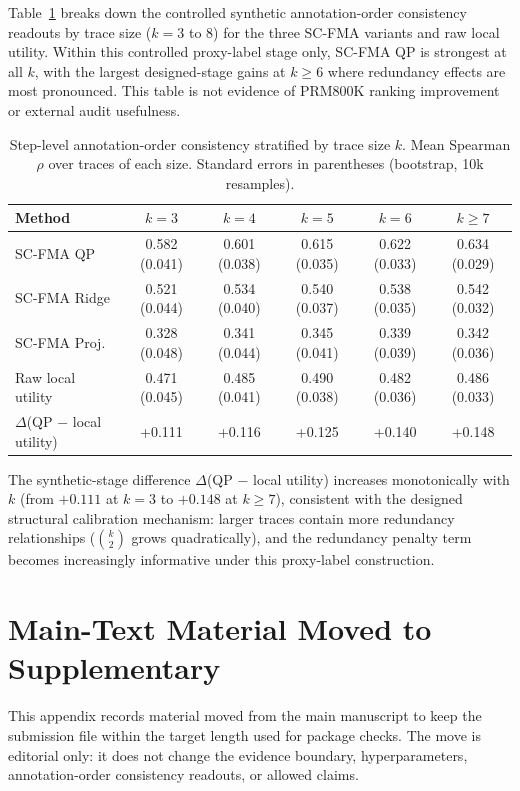 \documentclass[pdflatex,sn-mathphys-num]{sn-jnl}
\begin{document}
Table~\ref{tab:per-size} breaks down the controlled synthetic annotation-order consistency readouts by trace size ($k = 3$ to $8$) for the three SC-FMA variants and raw local utility. Within this controlled proxy-label stage only, SC-FMA QP is strongest at all $k$, with the largest designed-stage gains at $k \ge 6$ where redundancy effects are most pronounced. This table is not evidence of PRM800K ranking improvement or external audit usefulness.

\begin{table}[ht]
\caption{Step-level annotation-order consistency stratified by trace size $k$. Mean Spearman $\rho$ over traces of each size. Standard errors in parentheses (bootstrap, 10k resamples).}
\label{tab:per-size}
\centering
\small
\begin{tabular}{lccccc}
\toprule
\textbf{Method} & $k=3$ & $k=4$ & $k=5$ & $k=6$ & $k \ge 7$ \\
\midrule
SC-FMA QP      & 0.582 (0.041) & 0.601 (0.038) & 0.615 (0.035) & 0.622 (0.033) & 0.634 (0.029) \\
SC-FMA Ridge   & 0.521 (0.044) & 0.534 (0.040) & 0.540 (0.037) & 0.538 (0.035) & 0.542 (0.032) \\
SC-FMA Proj.   & 0.328 (0.048) & 0.341 (0.044) & 0.345 (0.041) & 0.339 (0.039) & 0.342 (0.036) \\
Raw local utility & 0.471 (0.045) & 0.485 (0.041) & 0.490 (0.038) & 0.482 (0.036) & 0.486 (0.033) \\
\midrule
$\Delta$(QP $-$ local utility) & +0.111 & +0.116 & +0.125 & +0.140 & +0.148 \\
\bottomrule
\end{tabular}
\end{table}

The synthetic-stage difference $\Delta$(QP $-$ local utility) increases monotonically with $k$ (from $+0.111$ at $k=3$ to $+0.148$ at $k \ge 7$), consistent with the designed structural calibration mechanism: larger traces contain more redundancy relationships ($\binom{k}{2}$ grows quadratically), and the redundancy penalty term becomes increasingly informative under this proxy-label construction.

\section{Main-Text Material Moved to Supplementary}
\label{app:moved-main-material}

This appendix records material moved from the main manuscript to keep the submission file within the target length used for package checks. The move is editorial only: it does not change the evidence boundary, hyperparameters, annotation-order consistency readouts, or allowed claims.
\end{document}
